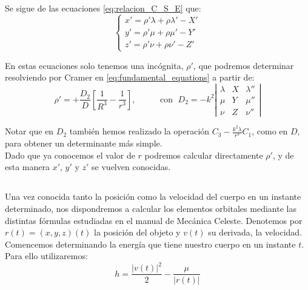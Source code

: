 \documentclass[11pt]{article}
\begin{document}
\subsection{}
\label{subsec:velocity_component}
Se sigue de las ecuaciones \eqref{eq:relacion_C_S_E} que:
\[
\left\{
\begin{array}{l}
	x'=\rho'\lambda+\rho\lambda'-X'\\
	y'=\rho'\mu+\rho\mu'-Y'\\
	z'=\rho'\nu+\rho\nu'-Z'
\end{array}
\right.	
\]

En estas ecuaciones solo tenemos una incógnita, $\rho'$, que podremos determinar resolviendo por Cramer en \eqref{eq:fundamental_equations} a partir de:
\[
\rho'=+\frac{D_2}{D}[\frac{1}{R^3}-\frac{1}{r^3}],
\; \; \; \; \; \; \; \; \; \text{ con } \;
D_2 = -k^2
\left|
\begin{array}{ccc}
\lambda & X & \lambda''\\
\mu & Y & \mu''\\
\nu & Z & \nu''
\end{array}
\right|
\]

Notar que en $D_2$ también hemos realizado la operación $C_3-\frac{k^2\lambda}{r^3}C_1$, como en $D$, para obtener un determinante más simple.\\

Dado que ya conocemos el valor de $r$ podremos calcular directamente $\rho'$, y de esta manera $x'$, $y'$ y $z'$ se vuelven conocidas.\\

\subsection{}
\label{subsec:elements_determination}
Una vez conocida tanto la posición como la velocidad del cuerpo en un instante determinado, nos dispondremos a calcular los elementos orbitales mediante las distintas fórmulas estudiadas en el manual de Mecánica Celeste\cite{ortega}. Denotemos por $r(t)=(x,y,z)(t)$ la posición del objeto y $v(t)$ su derivada, la velocidad.\\

Comencemos determinando la energía que tiene nuestro cuerpo en un instante $t$. Para ello utilizaremos:
\[
h=\frac{|v(t)|^2}{2}-\frac{\mu}{|r(t)|}
\]
\end{document}
